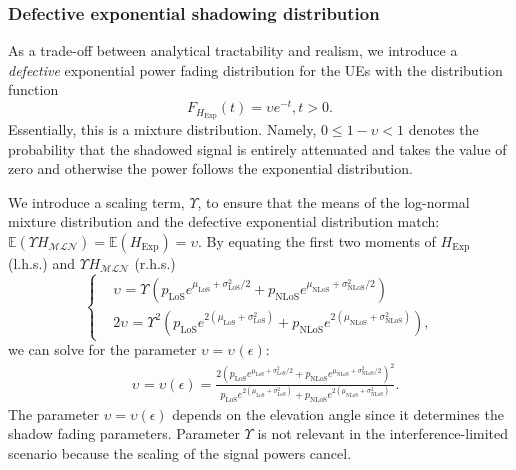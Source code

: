 \documentclass[lettersize,journal]{IEEEtran}
\begin{document}
\subsubsection{Defective exponential shadowing distribution}
As a trade-off between analytical tractability and realism, we introduce a \textit{defective} exponential power fading distribution for the UEs with the distribution function
\begin{equation}
  \label{eq:defexp}
  F_{{H}_{\text{Exp}}}(t) = \upsilon e^{-t}, t>0.
\end{equation}
Essentially, this is a mixture distribution. Namely, $0 \leq 1-\upsilon < 1$ denotes the probability that the shadowed signal is entirely attenuated and takes the value of zero and otherwise the power follows the exponential distribution. 


 We introduce a scaling term, $\Upsilon$, to ensure that the means of the log-normal mixture distribution and the defective exponential distribution match: $\mathbb{E}(\Upsilon H_{\mathcal{MLN}}) = \mathbb{E}(H_{\text{Exp}}) = \upsilon$. By equating the first two moments of $H_{\text{Exp}}$ (l.h.s.) and $\Upsilon_{} H_{\mathcal{M} \mathcal{L}\mathcal{N}}$ (r.h.s.)
\begin{equation}
  \label{eq:matchingmoments}
  \begin{cases}
    &\upsilon_{} = \Upsilon_{} \left(p_{\text{LoS}} e^{\mu_{\text{LoS}} + \sigma_{\text{LoS}}^2/2} + p_{\text{NLoS}} e^{\mu_{\text{NLoS}} + \sigma_{\text{NLoS}}^2/2}\right)\\
    &2\upsilon_{}= \Upsilon_{}^2 \left( p_{\text{LoS}} e^{2(\mu_{\text{LoS}} + \sigma_{\text{LoS}}^2)} + p_{\text{NLoS}} e^{2(\mu_{\text{NLoS}} + \sigma_{\text{NLoS}}^2)} \right), 
  \end{cases}
\end{equation}
 we can solve for the parameter $\upsilon= \upsilon_{}(\epsilon)$:
\begin{align}
  \label{eq:upsilon}
  & \upsilon_{}=\upsilon(\epsilon) =\frac{ 2\left( p_{\text{LoS}}e^{\mu_{\text{LoS}}+\sigma^2_{\text{LoS}}/2}+p_{\text{NLoS}}e^{\mu_{\text{NLoS}}+\sigma^2_{\text{NLoS}}/2} \right)^2}{p_{\text{LoS}}e^{2(\mu_{\text{LoS}}+\sigma_{\text{LoS}}^2)}+p_{\text{NLoS}}e^{2(\mu_{\text{NLoS}}+\sigma_{\text{NLoS}}^2)}}.
\end{align}
The parameter $\upsilon=\upsilon(\epsilon)$ depends on the elevation angle since it determines the shadow fading parameters. Parameter $\Upsilon$ is not relevant in the interference-limited scenario because the scaling of the signal powers cancel.
\end{document}
